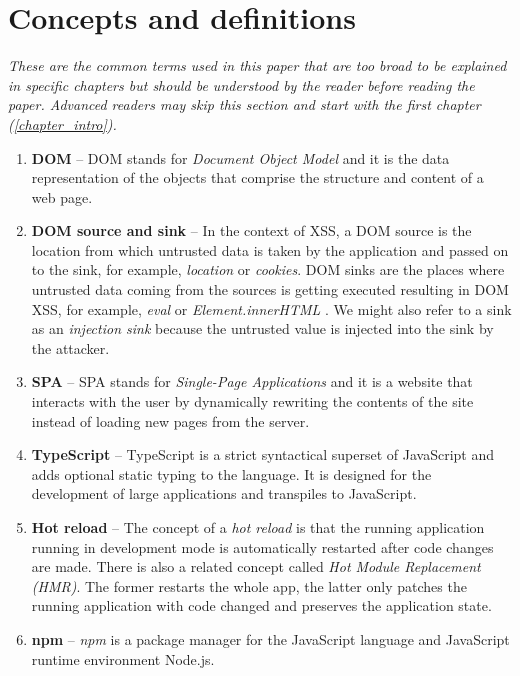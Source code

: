 \chapter*{Concepts and definitions} %
\label{definitions}

\emph{These are the common terms used in this paper that are too broad to be explained in specific
  chapters but should be understood by the reader before reading the paper. Advanced readers may
  skip this section and start with the first chapter (\ref{chapter_intro}).}

\begin{enumerate}
  \item \label{def:dom} \textbf{DOM} -- DOM stands for \emph{Document Object Model} and it is
        the data representation of the objects that comprise the structure and content of a web
        page.
  \item \label{def:dom_source_sink} \textbf{DOM source and sink} -- In the context of XSS, a DOM
        source is the location from which untrusted data is taken by the application and passed on
        to the sink, for example, \emph{location} or \emph{cookies}. DOM sinks are the places where
        untrusted data coming from the sources is getting executed resulting in DOM XSS, for
        example, \emph{eval} or \emph{Element.innerHTML} \cite{source_sink_definition}. We might
        also refer to a sink as an \emph{injection sink} because the untrusted value is injected
        into the sink by the attacker.
  \item \label{def:spa} \textbf{SPA} -- SPA stands for \emph{Single-Page Applications} and it
        is a website that interacts with the user by dynamically rewriting the contents of the site
        instead of loading new pages from the server.
  \item \label{def:ts} \textbf{TypeScript} -- TypeScript is a strict syntactical superset of
        JavaScript and adds optional static typing to the language. It is designed for the
        development of large applications and transpiles to JavaScript.
  \item \label{def:hot_reload} \textbf{Hot reload} -- The concept of a \emph{hot reload} is that the
        running application running in development mode is automatically restarted after code
        changes are made. There is also a related concept called \emph{Hot Module Replacement
          (HMR)}. The former restarts the whole app, the latter only patches the running application
        with code changed and preserves the application state.
  \item \label{def:npm} \textbf{npm} -- \emph{npm} is a package manager for the JavaScript
        language and JavaScript runtime environment Node.js.
\end{enumerate}
